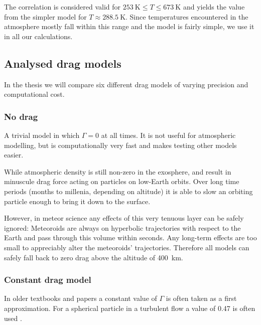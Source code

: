             The correlation is considered valid for $\SI{253}{\kelvin} \leq T \leq \SI{673}{\kelvin}$
            and yields the value from the simpler model for $T \approx \SI{288.5}{\kelvin}$.
            Since temperatures encountered in the atmosphere mostly fall within this range
            and the model is fairly simple, we use it in all our calculations.

    \subsection{Analysed drag models} \label{fdm}
        In the thesis we will compare six different drag models of varying precision
        and computational cost.

        \subsubsection{No drag} \label{fdmn}
            A trivial model in which $\Gamma = 0$ at all times.
            It is not useful for atmospheric modelling, but is computationally
            very fast and makes testing other models easier.

            While atmospheric density is still non-zero in the exosphere,
            and result in minuscule drag force acting on particles on low-Earth orbits.
            Over long time periods (months to millenia, depending on altitude) it is able to slow
            an orbiting particle enough to bring it down to the surface.

            However, in meteor science any effects of this very tenuous layer can be safely ignored:
            Meteoroids are always on hyperbolic trajectories with respect to the Earth
            and pass through this volume within seconds. Any long-term effects
            are too small to appreciably alter the meteoroids' trajectories.
            Therefore all models can safely fall back to zero drag above the altitude of \SI{400}{\kilo\metre}.

        \subsubsection{Constant drag model} \label{fdmc}
            In older textbooks and papers a constant value of $\Gamma$ is often taken as a first approximation.
            For a spherical particle in a turbulent flow a value of \num{0.47}
            is often used \cite{???}. \cite{hrábek} \cite{havrila}

